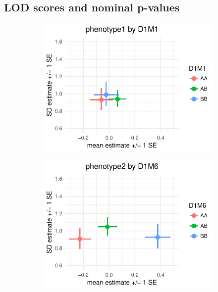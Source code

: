 \documentclass[9pt,twocolumn,twoside]{gsag3jnl}
\begin{document}
\subsection{LOD scores and nominal p-values}

\begin{figure}[t]
    \begin{subfigure}[t]{0.5\linewidth}
        \includegraphics[width=\textwidth]{images/mean_var_plot_phen1.pdf}
    \end{subfigure}
    \hfill
    \begin{subfigure}[t]{0.5\linewidth}
        \includegraphics[width=\textwidth]{images/mean_var_plot_phen2.pdf}
    \end{subfigure}


\end{figure}
\end{document}
